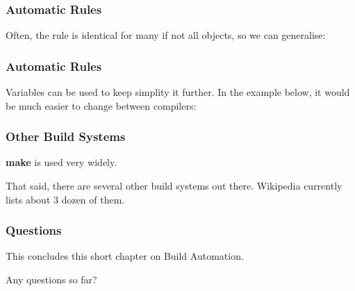 
\begin{frame}
    \frametitle{Automatic Rules}
    Often, the rule is identical for many if not all objects, so we can generalise:
\LstGen
\end{frame}


\begin{frame}
    \frametitle{Automatic Rules}
    Variables can be used to keep simplity it further. In the example below, it would be much easier to change between compilers:
\LstVars
\end{frame}

\begin{frame}
    \frametitle{Other Build Systems}
    \textbf{make} is used very widely. 
    
    That said, there are several other build systems out there.
    Wikipedia currently lists about 3 dozen of them.

\end{frame}

\begin{frame}
    \frametitle{Questions}
    This concludes this short chapter on Build Automation.

    Any questions so far?
\end{frame}
